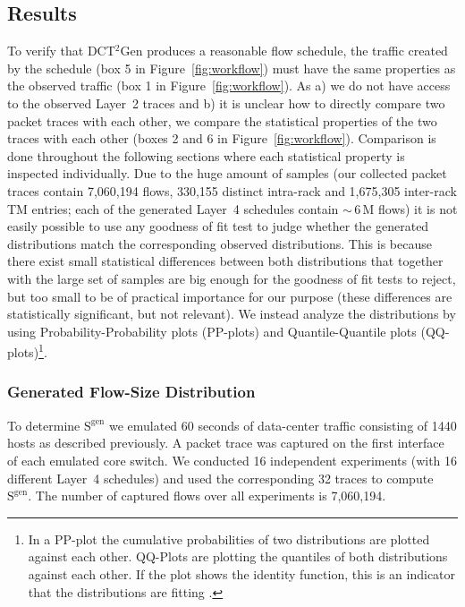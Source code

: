 \documentclass[journal,10pt]{IEEEtran}
\newcommand{\genname}{DCT${^2}$Gen}
\newcommand{\lt}{Layer~2}
\newcommand{\lf}{Layer~4}
\newcommand{\size}[1]{\ensuremath{\mathrm{S}  ^{\mathrm{#1}}}}
\begin{document}
	\subsection{Results}
		To verify that \genname{} produces a reasonable flow schedule, the traffic created by the schedule (box 5 in Figure~\ref{fig:workflow}) 
		must have the same properties as the observed traffic (box 1 in Figure~\ref{fig:workflow}).
		As a) we do not have access to the observed \lt{} traces and b) it is unclear how to directly compare two packet traces with each other,
		we compare the statistical properties of the two traces with each other (boxes 2 and 6 in Figure~\ref{fig:workflow}).
		Comparison is done throughout the following sections where each statistical property is inspected individually.
		Due to the huge amount of samples (our collected packet traces contain 7,060,194 flows, 330,155 distinct intra-rack and 1,675,305 inter-rack TM entries; 
		each of the generated \lf{} schedules contain $\sim$\,6\,M flows)
		it is not easily possible to use any goodness of fit test to judge whether the generated distributions match
		the corresponding observed distributions.
		This is because there exist small statistical differences between both distributions that together with the large set of samples are big enough for the 
		goodness of fit tests to reject, but too small to be of practical importance for our purpose
		(these differences are statistically significant, but not relevant).
		We instead analyze the distributions by using 
		Probability-Probability plots (PP-plots) and Quantile-Quantile plots (QQ-plots)\footnote{In a PP-plot the cumulative probabilities of two distributions are plotted against each other. QQ-Plots are plotting the quantiles of both distributions against each other. If the plot shows the identity function,
		this is an indicator that the distributions are fitting \cite{GraphicalMethodsforDataAnalysis}.}.

		\subsubsection{Generated Flow-Size Distribution}
		\label{sec:GeneratedFlow-SizeDistribution}
			To determine \size{gen}
			we emulated 60 seconds of data-center traffic consisting of 1440 hosts as described previously.
			A packet trace was captured on the first interface of each emulated core switch.
			We conducted 16 independent experiments (with 16 different \lf{} schedules) and used the corresponding 32 traces to compute \size{gen}.
			The number of captured flows over all experiments is 7,060,194. 
\end{document}
